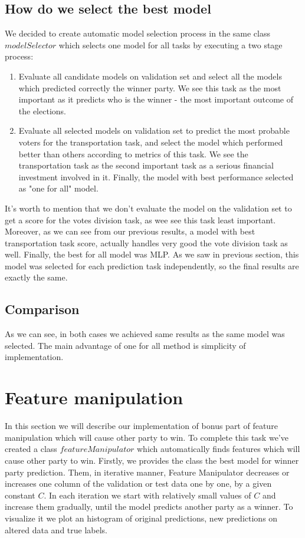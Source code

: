 \documentclass[12pt]{article}
\begin{document}
\subsection{How do we select the best model}
We decided to create automatic model selection process in the same class $modelSelector$ which selects one model for all tasks by executing a two stage process:
\begin{enumerate}
\item Evaluate all candidate models on validation set and select all the models which predicted correctly the winner party. We see this task as the most important as it predicts who is the winner - the most important outcome of the elections.
\item Evaluate all selected models on validation set to predict the most probable voters for the transportation task, and select the model which performed better than others according to metrics of this task. We see the transportation task as the second important task as a serious financial investment involved in it. Finally, the model with best performance selected as "one for all" model. 
\end{enumerate}
It's worth to mention that we don't evaluate the model on the validation set to get a score for the votes division task, as wee see this task least important. Moreover, as we can see from our previous results, a model with best transportation task score, actually handles very good the vote division task as well. Finally, the best for all model was MLP. As we saw in previous section, this model was selected for each prediction task independently, so the final results are exactly the same.  

\subsection{Comparison}
As we can see, in both cases we achieved same results as the same model was selected. The main advantage of one for all method is simplicity of implementation.

\newpage
\section{Feature manipulation}
In this section we will describe our implementation of bonus part of feature manipulation which will cause other party to win. To complete this task we've created a class $featureManipulator$ which automatically finds features which will cause other party to win. Firstly, we provides the class the best model for winner party prediction. Them, in iterative manner, Feature Manipulator decreases or increases one column of the validation or test data one by one, by a given constant $C$. In each iteration we start with relatively small values of $C$ and increase them gradually, until the model predicts another party as a winner. To visualize it we plot an histogram of original predictions, new predictions on altered data and true labels.   
\end{document}
